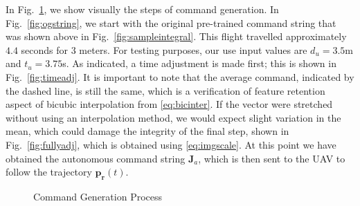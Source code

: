 \documentclass[letterpaper, 10 pt, conference]{ieeeconf}  %
\begin{document}
In Fig.~\ref{fig:gensample}, we show visually the steps of command generation. In Fig.~\ref{fig:ogstring}, we start with the original pre-trained command string that was shown above in Fig.~\ref{fig:sampleintegral}. This flight travelled approximately $4.4$ seconds for $3$ meters. For testing purposes, our use input values are $d_u=3.5$m and $t_u=3.75$s. As indicated, a time adjustment is made first; this is shown in Fig.~\ref{fig:timeadj}. It is important to note that the average command, indicated by the dashed line, is still the same, which is a verification of feature retention aspect of bicubic interpolation from \eqref{eq:bicinter}. If the vector were stretched without using an interpolation method, we would expect slight variation in the mean, which could damage the integrity of the final step, shown in Fig.~\ref{fig:fullyadj}, which is obtained using \eqref{eq:imgscale}. At this point we have obtained the autonomous command string $\bm{J}_a$, which is then sent to the UAV to follow the trajectory $\bm{p_r}(t)$.


\begin{figure}[h]
	\centering
	\caption{Command Generation Process}
	\label{fig:gensample}
\end{figure}
\end{document}
